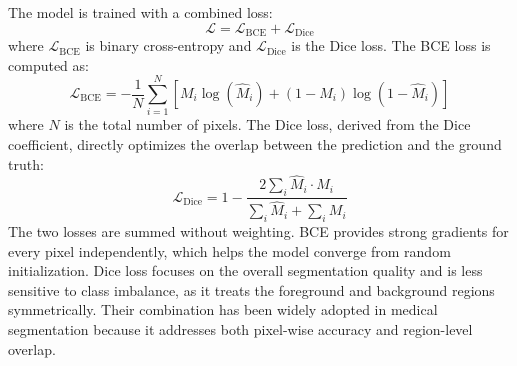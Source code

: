 The model is trained with a combined loss:
%
\begin{equation}
  \mathcal{L} = \mathcal{L}_\text{BCE} + \mathcal{L}_\text{Dice}
\end{equation}
%
where $\mathcal{L}_\text{BCE}$ is binary cross-entropy and $\mathcal{L}_\text{Dice}$ is the Dice loss. The BCE loss is computed as:
%
\begin{equation}
\mathcal{L}_\text{BCE} = -\frac{1}{N}\sum_{i=1}^{N} \left[ M_i \log(\hat{M}_i) + (1-M_i)\log(1-\hat{M}_i) \right]
\end{equation}
%
where $N$ is the total number of pixels. The Dice loss, derived from the Dice coefficient, directly optimizes the overlap between the prediction and the ground truth:
%
\begin{equation}
\mathcal{L}_\text{Dice} = 1 - \frac{2\sum_{i} \hat{M}_i \cdot M_i}{\sum_{i} \hat{M}_i + \sum_{i} M_i}
\end{equation}
%
The two losses are summed without weighting. BCE provides strong gradients for every pixel independently, which helps the model converge from random initialization. Dice loss focuses on the overall segmentation quality and is less sensitive to class imbalance, as it treats the foreground and background regions symmetrically. Their combination has been widely adopted in medical segmentation because it addresses both pixel-wise accuracy and region-level overlap.
